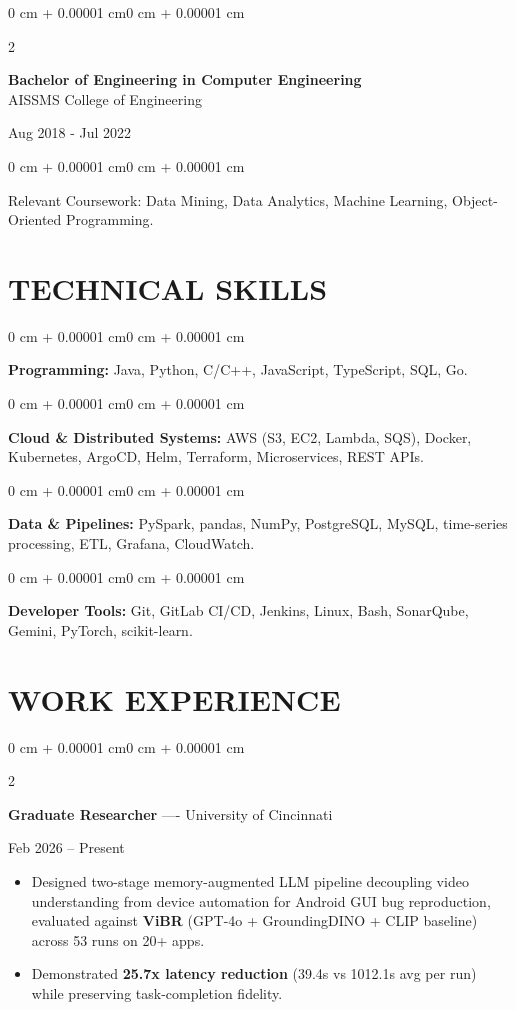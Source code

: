 \documentclass[10pt, letterpaper]{article}
\newenvironment{highlights}{
    \begin{itemize}[
        topsep=0.10 cm,
        parsep=0.06 cm,
        partopsep=0pt,
        itemsep=0.06 cm,
        leftmargin=12pt
    ]
}{
    \end{itemize}
}
\newenvironment{onecolentry}{
    \begin{adjustwidth}{0 cm + 0.00001 cm}{0 cm + 0.00001 cm}
}{
    \end{adjustwidth}
}
\newenvironment{twocolentry}[2][]{
    \onecolentry
    \def\secondColumn{#2}
    \setcolumnwidth{\fill, 4.5 cm}
    \begin{paracol}{2}
}{
    \switchcolumn \raggedleft \secondColumn
    \end{paracol}
    \endonecolentry
}
\begin{document}
\begin{twocolentry}{
    Aug 2018 - Jul 2022
}
    \textbf{Bachelor of Engineering in Computer Engineering} \\
    AISSMS College of Engineering
\end{twocolentry}
\begin{onecolentry}
Relevant Coursework: Data Mining, Data Analytics, Machine Learning, Object-Oriented Programming.
\end{onecolentry}
\section{TECHNICAL SKILLS}
\begin{onecolentry}
\textbf{Programming:} Java, Python, C/C++, JavaScript, TypeScript, SQL, Go.
\end{onecolentry}
\vspace{0.06 cm}
\begin{onecolentry}
\textbf{Cloud \& Distributed Systems:} AWS (S3, EC2, Lambda, SQS), Docker, Kubernetes, ArgoCD, Helm, Terraform, Microservices, REST APIs.
\end{onecolentry}
\vspace{0.06 cm}
\begin{onecolentry}
\textbf{Data \& Pipelines:} PySpark, pandas, NumPy, PostgreSQL, MySQL, time-series processing, ETL, Grafana, CloudWatch.
\end{onecolentry}
\vspace{0.06 cm}
\begin{onecolentry}
\textbf{Developer Tools:} Git, GitLab CI/CD, Jenkins, Linux, Bash, SonarQube, Gemini, PyTorch, scikit-learn.
\end{onecolentry}

\section{WORK EXPERIENCE}
\begin{twocolentry}{Feb 2026 -- Present}
\textbf{Graduate Researcher} ---- University of Cincinnati
\end{twocolentry}
\begin{highlights}
  \item Designed two-stage memory-augmented LLM pipeline decoupling video understanding from device automation for Android GUI bug reproduction, evaluated against \textbf{ViBR} (GPT-4o + GroundingDINO + CLIP baseline) across 53 runs on 20+ apps.
  \item Demonstrated \textbf{25.7x latency reduction} (39.4s vs 1012.1s avg per run) while preserving task-completion fidelity.
\end{highlights}
\end{document}
